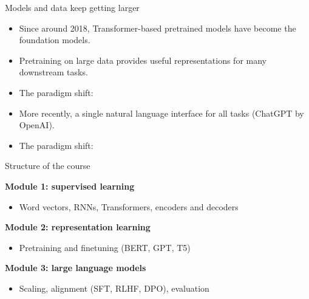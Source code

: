 \documentclass[usenames,dvipsnames,notes,11pt,aspectratio=169]{beamer}
\begin{document}
\begin{frame}
    {Models and data keep getting larger}
    \begin{itemize}
        \itemsep1em
        \item Since around 2018, Transformer-based pretrained models have become the foundation models. 
        \item Pretraining on large data provides useful representations for many downstream tasks.
        \item The paradigm shift: 
        \item More recently, a single natural language interface for all tasks (\eg ChatGPT by OpenAI).
        \item The paradigm shift: 
    \end{itemize}
\end{frame}

\begin{frame}
    {Structure of the course}
    \begin{wideitemize}
        \item {\bf Module 1: supervised learning}\\
            \begin{itemize}
                \item Word vectors, RNNs, Transformers, encoders and decoders
            \end{itemize}

        \item {\bf Module 2: representation learning}\\
            \begin{itemize}
                \item Pretraining and finetuning (BERT, GPT, T5)
            \end{itemize}

        \item {\bf Module 3: large language models} \\
            \begin{itemize}
                \item Scaling, alignment (SFT, RLHF, DPO), evaluation  
            \end{itemize}
    \end{wideitemize}
\end{frame}
\end{document}
